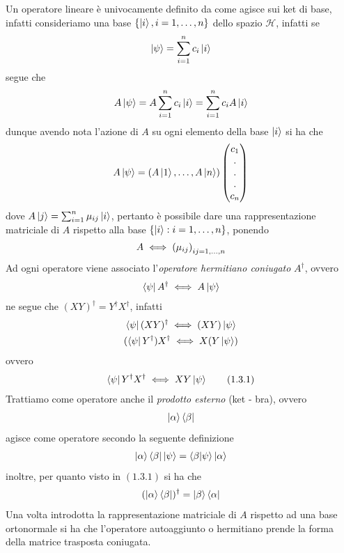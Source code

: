 \documentclass{article}
\begin{document}
Un operatore lineare è univocamente definito da come agisce sui ket di base, infatti consideriamo una base $\{ \ket{i}, i = 1, \dots, n \}$ dello spazio $\mathcal{H}$, infatti se
\begin{gather}
    \ket{\psi} = \sum_{i = 1}^n c_i \ket{i} \notag
\end{gather}
segue che
\begin{gather}
    A\ket{\psi} = A \sum_{i = 1}^n c_i \ket{i} = \sum_{i = 1}^n c_i A\ket{i} \notag
\end{gather}
dunque avendo nota l'azione di $A$ su ogni elemento della base $\ket{i}$ si ha che
\begin{gather}
    A\ket{\psi} = \left( A\ket{1}, \dots, A\ket{n} \right) \begin{pmatrix}
        c_1 \\
        . \\
        . \\
        . \\
        c_n
    \end{pmatrix} \notag
\end{gather}
dove $A\ket{j} = \sum_{i = 1}^n \mu_{ij}\ket{i}$, pertanto è possibile dare una rappresentazione matriciale di $A$ rispetto alla base $\left\{ \ket{i} : i = 1, \dots, n\right\}$, ponendo
\begin{gather}
    A \iff \left( \mu_{ij} \right)_{ij = 1, \dots, n} \notag
\end{gather}
Ad ogni operatore viene associato l'\textit{operatore hermitiano coniugato} $A^\dagger$, ovvero
\begin{gather}
    \bra{\psi}A^\dagger \iff A\ket{\psi} \notag
\end{gather}
ne segue che $(XY)^\dagger = Y^\dagger X^\dagger$, infatti
\begin{gather}
    \bra{\psi}(XY)^\dagger \iff (XY)\ket{\psi} \notag \\
    (\bra{\psi}Y^\dagger)X^\dagger \iff X(Y\ket{\psi}) \notag
\end{gather}
ovvero
\begin{gather}
    \bra{\psi}Y^\dagger X^\dagger \iff XY\ket{\psi} \tag{1.3.1}
\end{gather}
Trattiamo come operatore anche il \textit{prodotto esterno} (ket - bra), ovvero
\begin{gather}
    \ket{\alpha}\bra{\beta} \notag
\end{gather}
agisce come operatore secondo la seguente definizione
\begin{gather}
    \ket{\alpha}\bra{\beta} \ket{\psi} = \braket{\beta | \psi} \ket{\alpha} \notag
\end{gather}
inoltre, per quanto visto in $(1.3.1)$ si ha che
\begin{gather}
    (\ket{\alpha}\bra{\beta})^\dagger = \ket{\beta}\bra{\alpha} \notag
\end{gather}
Una volta introdotta la rappresentazione matriciale di $A$ rispetto ad una base ortonormale si ha che l'operatore autoaggiunto o hermitiano prende la forma della matrice trasposta coniugata.
\end{document}

